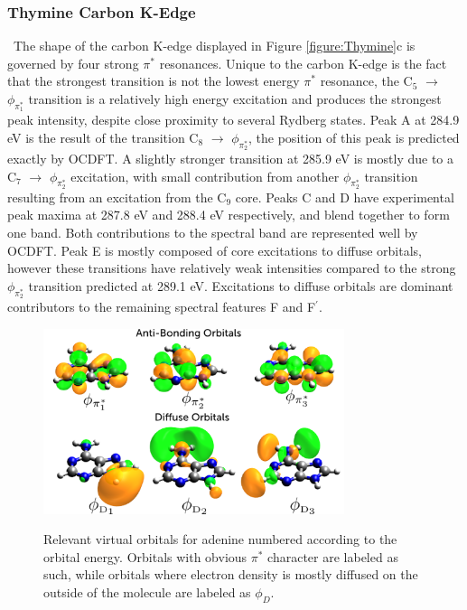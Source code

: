 \documentclass[12pt]{article}
\begin{document}
\subsubsection{Thymine Carbon K-Edge} \
   The shape of the carbon K-edge displayed in Figure \ref{figure:Thymine}c is governed by four strong $\pi^*$ resonances. Unique to the carbon K-edge is the fact that the strongest transition is not the lowest energy $\pi^*$ resonance, the C$_5$ $\rightarrow$ $\phi_{\pi_1^*}$ transition is a relatively high energy excitation and produces the strongest peak intensity, despite close proximity to several Rydberg states. Peak A at 284.9 eV is the result of the transition C$_8$ $\rightarrow$ $\phi_{\pi_2^*}$, the position of this peak is predicted exactly by OCDFT. A slightly stronger transition at 285.9 eV is mostly due to a  C$_7$ $\rightarrow$ $\phi_{\pi_2^*}$ excitation, with small contribution from another $\phi_{\pi_2^*}$ transition resulting from an excitation from the C$_9$ core. Peaks C and D have experimental peak maxima at 287.8 eV and 288.4 eV respectively, and blend together to form one band. Both contributions to the spectral band are represented well by OCDFT.
Peak E is mostly composed of core excitations to diffuse orbitals, however these transitions have relatively weak intensities compared to the strong $\phi_{\pi_2^*}$ transition predicted at 289.1 eV. Excitations to diffuse orbitals are dominant contributors to the remaining spectral features F and F$^{\prime}$.
\begin{figure}[!h]
\centering
\includegraphics[width=8.8cm]{figure_8.png} \\
\caption{Relevant virtual orbitals for adenine numbered according to the orbital energy. Orbitals with obvious $\pi^*$ character are labeled as such, while orbitals where electron density is mostly diffused on the outside of the molecule are labeled as $\phi_D$.}
\label{figure:adeninevirtuals} 
\end{figure}
\end{document}
